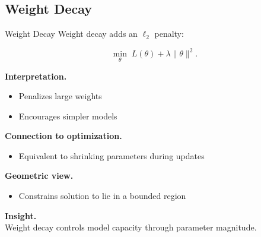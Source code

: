 \documentclass[aspectratio=169,11pt]{beamer}
\begin{document}
\subsection{Weight Decay}
\begin{frame}[t,allowframebreaks]{Weight Decay}
\small
Weight decay adds an $\ell_2$ penalty:

\[
\min_\theta \; L(\theta) + \lambda \|\theta\|^2.
\]

\textbf{Interpretation.}\\ \begin{itemize}
    \item Penalizes large weights
    \item Encourages simpler models
\end{itemize}

\textbf{Connection to optimization.}\\ \begin{itemize}
    \item Equivalent to shrinking parameters during updates
\end{itemize}

\textbf{Geometric view.}\\ \begin{itemize}
    \item Constrains solution to lie in a bounded region
\end{itemize}

\textbf{Insight.}\\ Weight decay controls model capacity through parameter magnitude.
\end{frame}
\end{document}
